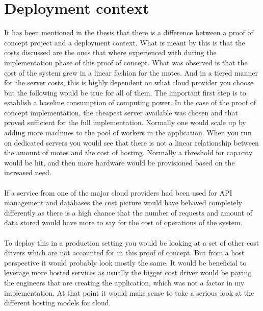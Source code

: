\documentclass[]{uiophd}
\begin{document}
\section{Deployment context}
It has been mentioned in the thesis that there is a difference between a proof of concept project and a deployment context. What is meant by this is that the costs discussed are the ones that where experienced with during the implementation phase of this proof of concept. What was observed is that the cost of the system grew in a linear fashion for the motes. And in a tiered manner for the server costs, this is highly dependent on what cloud provider you choose but the following would be true for all of them. The important first step is to establish a baseline consumption of computing power. In the case of the proof of concept implementation, the cheapest server available was chosen and that proved sufficient for the full implementation. Normally one would scale up by adding more machines to the pool of workers in the application. When you run on dedicated servers you would see that there is not a linear relationship between the amount of motes and the cost of hosting. Normally a threshold for capacity would be hit, and then more hardware would be provisioned based on the increased need.
\\\\
If a service from one of the major cloud providers had been used for API management and databases the cost picture would have behaved completely differently as there is a high chance that the number of requests and amount of data stored would have more to say for the cost of operations of the system.
\\\\
To deploy this in a production setting you would be looking at a set of other cost drivers which are not accounted for in this proof of concept. But from a host perspective it would probably look mostly the same. It would be beneficial to leverage more hosted services as usually the bigger cost driver would be paying the engineers that are creating the application, which was not a factor in my implementation. At that point it would make sense to take a serious look at the different hosting models for cloud.
\\\\
\end{document}
